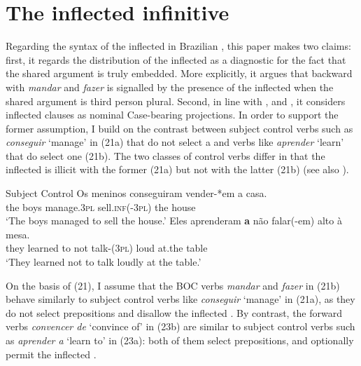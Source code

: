\documentclass[output=paper]{langsci/langscibook}
\begin{document}
\section{The inflected infinitive}%

Regarding the syntax of the inflected  in Brazilian , this paper makes two claims: first, it regards the distribution of the inflected  as a diagnostic for the fact that the shared argument is truly embedded. More explicitly, it argues that backward  with \textit{mandar} and \textit{fazer} is signalled by the presence of the inflected  when the shared argument is third person plural. Second, in line with \citet{Raposo1987}, \citet{Nunes1995} and \citet{Pires2007}, it considers inflected  clauses as nominal Case-bearing projections. In order to support the former assumption, I build on the contrast between subject control verbs such as \textit{conseguir} ‘manage’ in (21a) that do not select a  and verbs like \textit{aprender} ‘learn’ that do select one (21b). The two classes of control verbs differ in that the inflected  is illicit with the former (21a) but not with the latter (21b) (see also \citealt{Modesto2010}). 

\ea%
         Subject Control\label{ex:moreno:21}
    \ea  
    \gll Os meninos conseguiram   vender-*em   a casa.  \\
         the boys      manage.\textsc{3pl}    sell\textsc{.inf(-3pl)}  the house\\
    \glt ‘The boys managed to sell the house.’
    \ex  
    \gll Eles    aprenderam \textbf{a}  não   falar(-em)     alto  à        mesa.     \\
         they    learned        to not    talk-(\textsc{3pl})  loud at.the table  \\
    \glt ‘They learned not to talk loudly at the table.’
    \z
\z

On the basis of (21), I assume that the BOC verbs \textit{mandar} and \textit{fazer} in (21b) behave similarly to subject control verbs like \textit{conseguir} ‘manage’ in (21a), as they do not select prepositions and disallow the inflected . By contrast, the forward  verbs \textit{convencer de} ‘convince of’ in (23b) are similar to subject control verbs such as \textit{aprender a} ‘learn to’ in (23a): both of them select prepositions, and optionally permit the inflected .
\end{document}
